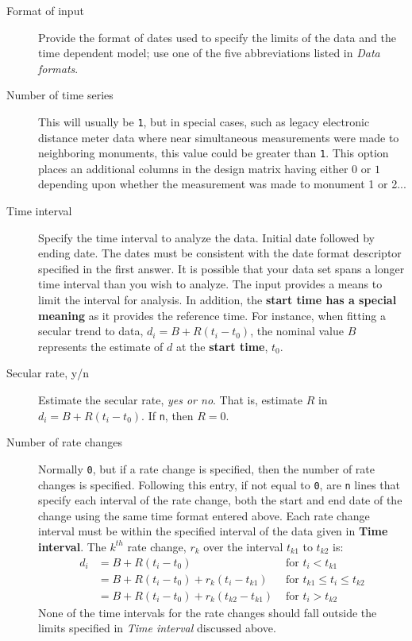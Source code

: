 \documentclass[12pt]{amsart}
\begin{document}
\begin{description}
\item[Format of input]  Provide the format of dates used to specify the limits of the data and the time dependent model; use one of the five abbreviations listed in \textit{Data formats}. 

\item[Number of time series] This will usually be \texttt{1}, but in special cases, such as legacy electronic distance meter
data where near simultaneous measurements were made to neighboring monuments, this value could be greater than \texttt{1}. 
This option places an additional columns in the design matrix having either $0$ or $1$ depending upon whether
the measurement was made to monument 1 or 2...

\item[Time interval] Specify the time interval to analyze the data. Initial date followed by ending date. The dates must be
consistent with the date format descriptor specified in the first answer. It is possible that your data set spans a longer
time interval than you wish to analyze. The input provides a means to limit the interval for analysis. In addition, the
\textbf{start time has a special meaning} as it provides the reference time.  For instance, when fitting a secular trend to data, $d_i = B + R (t_i -t_{0})$, the nominal value $B$ represents the estimate of $d$ at the \textbf{start time}, $t_{0}$.

\item[Secular rate, y/n]  Estimate the secular rate, \textit{yes or no}.  That is, estimate $R$ in $d_i = B + R (t_i -t_{0})$.
If \texttt{n}, then $R=0$.

\item[Number of rate changes]  Normally \texttt{0}, but if a rate change is specified, then the number of rate changes is specified.  Following this entry, if not equal to \texttt{0}, are \texttt{n} lines that specify each interval of the rate change, both the start and end date of the change using the same time format entered above.  Each rate change interval must be
within the specified interval of the data given in \textbf{Time interval}. The $k^{th}$ rate change, $r_k$ over the interval
$t_{k1}$ to $t_{k2}$ is:
\begin{equation}
\begin{aligned}
d_i & = B + R (t_i - t_0)  & \text{ for } t_i < t_{k1} \\
      & = B + R (t_i - t_0) + r_k (t_i - t_{k1}) & \text{ for } t_{k1} \leq t_i \leq t_{k2} \\
      & = B + R (t_i - t_0) + r_k (t_{k2} - t_{k1}) & \text{ for } t_i >  t_{k2}
\end{aligned}
\end{equation}
None of the time intervals for the rate changes should fall outside the limits specified in \textit{Time interval} discussed above.


\end{description}
\end{document}
